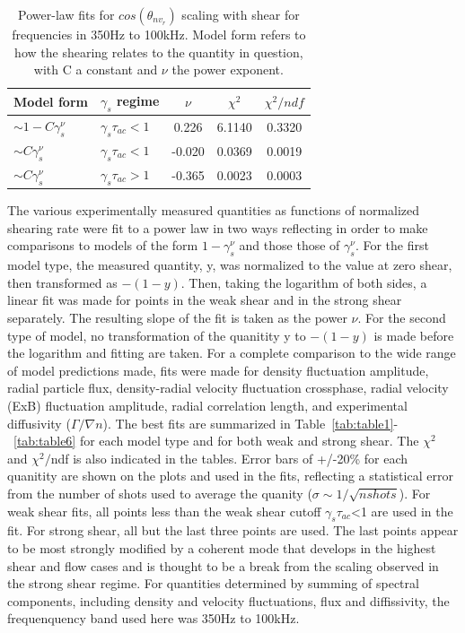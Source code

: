 \documentclass[aip,pop,amsmath,amssymb,preprint,superscriptaddress]{revtex4-1} %
\begin{document}
\begin{table}
\caption{\label{tab:table4}Power-law fits for $cos(\theta_{nv_{r}})$ scaling with shear for frequencies in 350Hz to 100kHz. Model form refers to how the shearing relates to the quantity in question, with C a constant and $\nu$ the power exponent.}
\begin{ruledtabular}
\begin{tabular}{llccc}
Model form&$\gamma_{s}$ regime&$\nu$&$\chi^2$&$\chi^2/ndf$\\
\hline
$\sim 1-C\gamma_{s}^\nu$&$\gamma_{s}\tau_{ac}<1$ &0.226   &6.1140    &0.3320\\
$\sim C\gamma_{s}^\nu$&$\gamma_{s}\tau_{ac}<1$   &-0.020  &0.0369    &0.0019\\
$\sim C\gamma_{s}^\nu$&$\gamma_{s}\tau_{ac}>1$   &-0.365  &0.0023    &0.0003\\
\end{tabular}
\end{ruledtabular}
\end{table}

The various experimentally measured quantities as functions of normalized shearing rate were fit to a power law in two ways reflecting in order to make comparisons to models of the form $1-\gamma_{s}^{\nu}$ and those those of $\gamma_{s}^{\nu}$. For the first model type, the measured quantity, y, was normalized to the value at zero shear, then transformed as $-(1-y)$. Then, taking the logarithm of both sides, a linear fit was made for points in the weak shear and in the strong shear separately. The resulting slope of the fit is taken as the power $\nu$. For the second type of model, no transformation of the quanitity y to $-(1-y)$ is made before the logarithm and fitting are taken. For a complete comparison to the wide range of model predictions made, fits were made for density fluctuation amplitude, radial particle flux, density-radial velocity fluctuation crossphase, radial velocity (ExB) fluctuation amplitude, radial correlation length, and experimental diffusivity ($\Gamma/\nabla n$). The best fits are summarized in Table~\ref{tab:table1}-~\ref{tab:table6} for each model type and for both weak and strong shear. The $\chi^{2}$ and $\chi^{2}/$ndf is also indicated in the tables.  Error bars of +/-20\% for each quanitity are shown on the plots and used in the fits, reflecting a statistical error from the number of shots used to average the quanity ($\sigma \sim 1/\sqrt{nshots}$). For weak shear fits, all points less than the weak shear cutoff $\gamma_{s}\tau_{ac}$<1 are used in the fit. For strong shear, all but the last three points are used. The last points appear to be most strongly modified by a coherent mode that develops in the highest shear and flow cases and is thought to be a break from the scaling observed in the strong shear regime. For quantities determined by summing of spectral components, including density and velocity fluctuations, flux and diffissivity, the frequenquency band used here was 350Hz to 100kHz.
\end{document}
